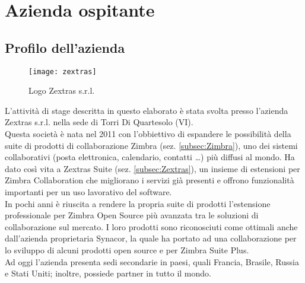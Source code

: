 \chapter{Azienda ospitante}\label{chap:company}

\section{Profilo dell'azienda}
\begin{figure}[H] 
	\centering
	\texttt{[image: zextras]}
	\caption{Logo Zextras s.r.l.}
	\label{fig:logoZextras}
\end{figure}
L'attività di stage descritta in questo elaborato è stata svolta presso l'azienda Zextras s.r.l. nella sede di Torri Di Quartesolo (VI). \\
Questa società è nata nel 2011 con l'obbiettivo di espandere le possibilità della suite di prodotti di collaborazione Zimbra (sez. \ref{subsec:Zimbra}), uno dei sistemi collaborativi (posta elettronica, calendario, contatti …) più diffusi al mondo. Ha dato così vita a Zextras Suite (sez. \ref{subsec:Zextras}), un insieme di estensioni per Zimbra Collaboration che migliorano i servizi già presenti e offrono funzionalità importanti per un uso lavorativo del software.\\
In pochi anni è riuscita a rendere la propria suite di prodotti l'estensione professionale per Zimbra Open Source più avanzata tra le soluzioni di collaborazione sul mercato. I loro prodotti sono riconosciuti come ottimali anche dall'azienda proprietaria Synacor, la quale ha portato ad una collaborazione per lo sviluppo di alcuni prodotti open source e per Zimbra Suite Plus.\\
Ad oggi l'azienda presenta sedi secondarie in paesi, quali Francia, Brasile, Russia e Stati Uniti;  inoltre, possiede partner in tutto il mondo.\\


